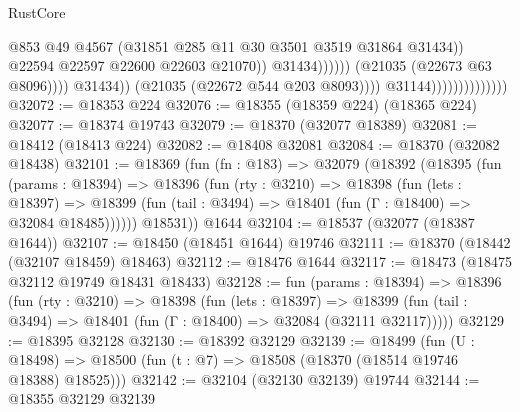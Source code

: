 \begin{lexlean}{RustCore}
\begin{coremodule}
                                                              @853
                                                              @49
                                                              @4567
                                                              (@31851
                                                                @285
                                                                @11
                                                                @30
                                                                @3501
                                                                @3519
                                                                @31864
                                                                @31434))
                                                            @22594
                                                            @22597
                                                            @22600
                                                            @22603
                                                            @21070))
                                                        @31434))))))
                                            (@21035 (@22673 @63 @8096))))
                                        @31434))
                                    (@21035 (@22672 @544 @203 @8093))))
                                @31144))))))))))))))
@32072 := @18353 @224
@32076 := @18355 (@18359 @224) (@18365 @224)
@32077 := @18374 @19743
@32079 := @18370 (@32077 @18389)
@32081 := @18412 (@18413 @224)
@32082 := @18408 @32081
@32084 := @18370 (@32082 @18438)
@32101 := @18369
    (fun (fn : @183) =>
    @32079
      (@18392
        (@18395
          (fun (params : @18394) =>
          @18396
            (fun (rty : @3210) =>
            @18398
              (fun (lets : @18397) =>
              @18399 (fun (tail : @3494) => @18401 (fun (Γ : @18400) => @32084 @18485))))))
        @18531))
    @1644
@32104 := @18537 (@32077 (@18387 @1644))
@32107 := @18450 (@18451 @1644) @19746
@32111 := @18370 (@18442 (@32107 @18459) @18463)
@32112 := @18476 @1644
@32117 := @18473 (@18475 @32112 @19749 @18431 @18433)
@32128 := fun (params : @18394) =>
  @18396
    (fun (rty : @3210) =>
    @18398
      (fun (lets : @18397) =>
      @18399 (fun (tail : @3494) => @18401 (fun (Γ : @18400) => @32084 (@32111 @32117)))))
@32129 := @18395 @32128
@32130 := @18392 @32129
@32139 := @18499
    (fun (U : @18498) => @18500 (fun (t : @7) => @18508 (@18370 (@18514 @19746 @18388) @18525)))
@32142 := @32104 (@32130 @32139) @19744
@32144 := @18355 @32129 @32139

\end{coremodule}
\end{lexlean}
